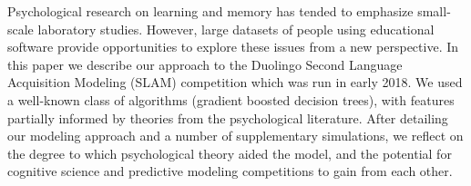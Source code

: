 Psychological research on learning and memory has tended to emphasize small-scale laboratory studies.  However, large datasets of people using educational software provide opportunities to explore these issues from a new perspective.  In this paper we describe our approach to the Duolingo Second Language Acquisition Modeling (SLAM) competition which was run in early 2018.  We used a well-known class of algorithms (gradient boosted decision trees), with features partially informed by theories from the psychological literature. After detailing our modeling approach and a number of supplementary simulations, we reflect on the degree to which psychological theory aided the model, and the potential for cognitive science and predictive modeling competitions to gain from each other.
